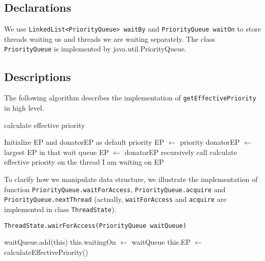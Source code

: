 \documentclass{article}
\begin{document}
\begin{spacing}{1.1}
\subsection{Declarations}

We use \texttt{LinkedList<PriorityQueue> waitBy} and \texttt{PriorityQueue waitOn} to store threads waiting us and threads we are waiting separately. The class \texttt{PriorityQueue} is implemented by java.util.PriorityQueue.

\subsection{Descriptions}

The following algorithm describes the implementation of \texttt{getEffectivePriority} in high level.

\begin{algorithm}[htbp]
  \caption{calculate effective priority}
\begin{algorithmic}[1]
  \STATE Initialize EP and donatorEP as default priority
  \STATE EP $\leftarrow$ priority
  \STATE donatorEP $\leftarrow$ largest EP in that wait queue
    \STATE EP $\leftarrow$ donatorEP
  \ENDIF
\ENDFOR
\STATE recursively call calculate effective priority on the thread I am waiting on
\RETURN EP
\end{algorithmic}
\end{algorithm}

To clarify how we manipulate data structure, we illustrate the implementation of function \linebreak \texttt{PriorityQueue.waitForAccess}, \texttt{PriorityQueue.acquire} and \texttt{PriorityQueue.nextThread} (actually, \linebreak \texttt{waitForAccess} and \texttt{acquire} are implemented in class \texttt{ThreadState}).

\begin{algorithm}[htbp]
  \caption{\texttt{ThreadState.wairForAccess(PriorityQueue waitQueue)}}
\begin{algorithmic}[1]
  \STATE waitQueue.add(this)  
  \STATE this.waitingOn $\leftarrow$ waitQueue  
  \STATE this.EP $\leftarrow$ calculateEffectivePriority()  
\RETURN
\end{algorithmic}
\end{algorithm}


\end{spacing}
\end{document}
